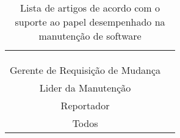 \begin{table}[htbp]
{\begin{tabular}{@{}cl@{}}
 & \cite{Vijayakumar2014, gegick2010identifying, izquierdo2015gila, Tian2012} \\
 & \cite{malheiros2012source, Song2010a, mani2012ausum} \\
 & \cite{Tu:2014:MQI:2677832.2677844, Aggarwal:2014:MIT:2593801.2593810, Wong:2014:BBF:2705615.2706096} \\ \midrule
\multirow{3}{*}{Gerente de Requisição de Mudança} & \cite{Vijayakumar2014, mani2012ausum, hindle2016contextual} \\
 & \cite{gegick2010identifying, sun2010discriminative, alipour2013contextual, zhang2011bug} \\
 & \cite{Nagwani2010, kochhar2014automatic, banerjee2012automated, ValdiviaGarcia:2014:CPB:2597073.2597099} \\ \midrule
Lider da Manutenção & \cite{Vijayakumar2014, Tian2012, netto2010automated, Nagwani2010} \\ \midrule
\multirow{2}{*}{Reportador} & \cite{bettenburg2008makes, Tu:2014:MQI:2677832.2677844, Vijayakumar2014} \\
 & \cite{Moran:2015:EAA:2786805.2807557, Thung2014, moran2015auto} \\ \midrule
Todos & \cite{hora2012bug, takama2013application, dal2014bug} \\ \bottomrule
\end{tabular}%
}
\caption{Lista de artigos de acordo com o suporte ao papel desempenhado na
    manutenção de software}
\label{tab:taxonomia-suporte-papeis}
\end{table}